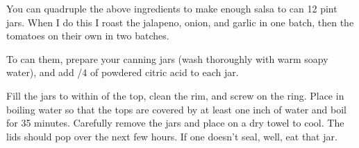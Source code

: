 \begin{ChefNotes}
    {You can quadruple the above ingredients to make enough salsa to can 12 pint
        jars. When I do this I roast the jalapeno, onion, and garlic in one batch,
        then the tomatoes on their own in two batches.

        To can them, prepare your canning jars (wash thoroughly with warm soapy
        water), and add /4 \tsp of powdered citric acid to each jar.

        Fill the jars to within  of the top, clean the rim, and screw
        on the ring. Place in boiling water so that the tops are covered by at
        least one inch of water and boil for 35 minutes. Carefully remove the
        jars and place on a dry towel to cool. The lids should pop over the next
        few hours. If one doesn't seal, well, eat that jar.}
\end{ChefNotes}